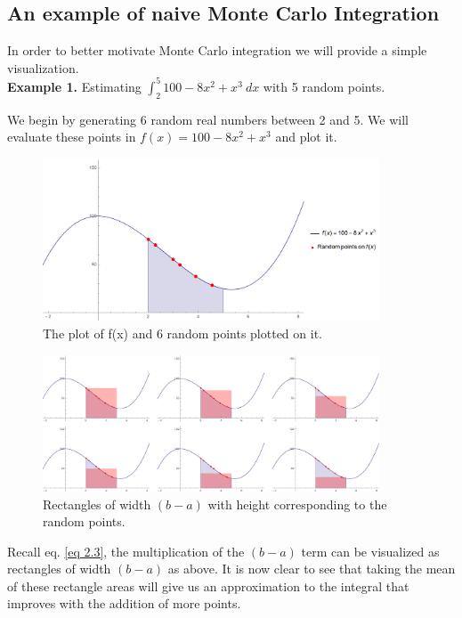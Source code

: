 \documentclass[12pt]{article}
\numberwithin{equation}{section}
\begin{document}
\subsection{An example of naive Monte Carlo Integration}
In order to better motivate Monte Carlo integration we will provide a simple visualization.\\
\textbf{Example 1.} Estimating $\int_2^5 100 - 8x^2 + x^3\ dx$ with 5 random points.
\par We begin by generating 6 random real numbers between 2 and 5. We will evaluate these points in $f(x)=100-8x^2+x^3$ and plot it.
\begin{figure}[!htb]
    \centering
    \includegraphics[width=10cm]{Images/pointsexample.png}
    \caption{The plot of f(x) and 6 random points plotted on it.}
    \label{fig:pointsexample}
\end{figure}
\begin{figure}[!htb]
    \centering
    \includegraphics[width=10cm]{Images/rectexample.png}
    \caption{Rectangles of width $(b-a)$ with height corresponding to the random points.}
    \label{fig:rectexample}
\end{figure}\par
Recall eq. \ref{eq 2.3}, the multiplication of the $(b-a)$ term can be visualized as rectangles of width $(b-a)$ as above.
It is now clear to see that taking the mean of these rectangle areas will give us an approximation to the integral that improves with the addition of more points.
\clearpage
\end{document}
